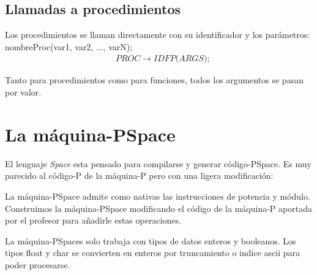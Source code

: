 \documentclass[a4paper, 12pt]{article}
\begin{document}
\subsection{Llamadas a procedimientos}
Los procedimientos se llaman directamente con su identificador y los parámetros:  nombreProc(var1, var2, ..., varN);
\begin{align*}
&PROC \rightarrow IDFP \textrm{(}ARGS\textrm{);}
\end{align*}

Tanto para procedimientos como para funciones, todos los argumentos se pasan por valor.

\section{La máquina-PSpace}

El lenguaje \textit{Space} esta pensado para compilarse y generar código-PSpace. Es muy parecido al código-P de la máquina-P pero con una ligera modificación:

La máquina-PSpace admite como nativas las instrucciones de potencia y módulo. Construimos la máquina-PSpace modificando el código de la máquina-P aportada por el profesor para añadirle estas operaciones.

La máquina-PSpaces solo trabaja con tipos de datos enteros y booleanos. Los tipos float y char se convierten en enteros por truncamiento o indice ascii para poder procesarse.
\end{document}
